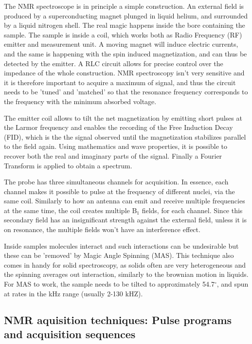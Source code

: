 \documentclass[12pt]{article}
\begin{document}
The NMR spectroscope is in principle a simple construction. An external field is produced by a superconducting magnet plunged in liquid helium, and surrounded by a liquid nitrogen shell. The real magic happens inside the bore containing the sample. The sample is inside a coil, which works both as Radio Frequency (RF) emitter and measurement unit. A moving magnet will induce electric currents, and the same is happening with the spin induced magnetization, and can thus be detected by the emitter. A RLC circuit allows for precise control over the impedance of the whole construction. NMR spectroscopy isn't very sensitive and it is therefore important to acquire a maximum of signal, and thus the circuit needs to be 'tuned' and 'matched' so that the resonance frequency corresponds to the frequency with the minimum absorbed voltage.

The emitter coil allows to tilt the net magnetization by emitting short pulses at the Larmor frequency and enables the recording of the Free Induction Decay (FID), which is the the signal observed until the magnetization stabilizes parallel to the field again. Using mathematics and wave properties, it is possible to recover both the real and imaginary parts of the signal. Finally a Fourier Transform is applied to obtain a spectrum.

The probe has three simultaneous channels for acquisition. In essence, each channel makes it possible to pulse at the frequency of different nuclei, via the same coil. Similarly to how an antenna can emit and receive multiple frequencies at the same time, the coil creates multiple B$_1$ fields, for each channel. Since this secondary field has an insignificant strength against the external field, unless it is on resonance, the multiple fields won't have an interference effect.

Inside samples molecules interact and such interactions can be undesirable but these can be 'removed' by Magic Angle Spinning (MAS). This technique also comes in handy for solid spectroscopy, as solids often are very heterogeneous and the spinning averages out interaction, similarly to the brownian motion in liquids. For MAS to work, the sample needs to be tilted to approximately 54.7$^{\circ}$, and spun at rates in the kHz range (usually 2-130 kHZ).

\subsection{NMR aquisition techniques: Pulse programs and acquisition sequences}
\end{document}
